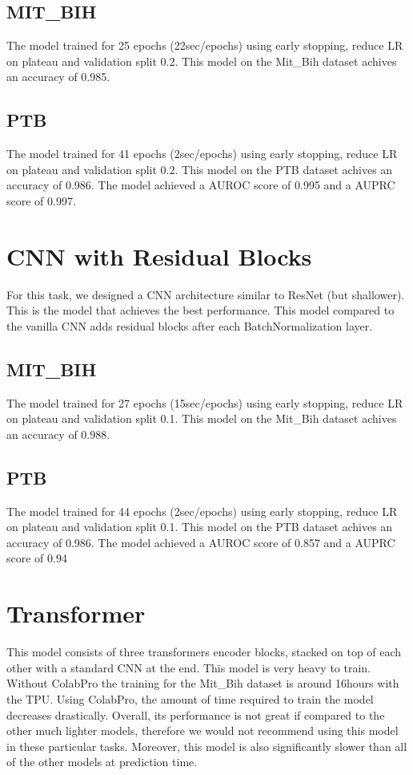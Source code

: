 \documentclass[11pt]{scrartcl}
\begin{document}
\subsection{MIT\_BIH}
The model trained for 25 epochs (22sec/epochs) using early stopping, reduce LR on plateau and validation split 0.2.
This model on the Mit\_Bih dataset achives an accuracy of 0.985.

\subsection{PTB}
The model trained for 41 epochs (2sec/epochs) using early stopping, reduce LR on plateau and validation split 0.2.
This model on the PTB dataset achives an accuracy of 0.986. The model achieved a AUROC score of 0.995 and a AUPRC score of 0.997.

\section{CNN with Residual Blocks}
For this task, we designed a CNN architecture similar to ResNet (but shallower). This is the model that achieves the best performance. This model compared to the vanilla CNN adds residual blocks after each BatchNormalization layer.
\subsection{MIT\_BIH}
The model trained for 27 epochs (15sec/epochs) using early stopping, reduce LR on plateau and validation split 0.1.
This model on the Mit\_Bih dataset achives an accuracy of 0.988.

\subsection{PTB}
The model trained for 44 epochs (2sec/epochs) using early stopping, reduce LR on plateau and validation split 0.1.
This model on the PTB dataset achives an accuracy of 0.986. The model achieved a AUROC score of 0.857 and a AUPRC score of 0.94

\section{Transformer}
This model consists of three transformers encoder blocks, stacked on top of each other with a standard CNN at the end. This model is very heavy to train. Without ColabPro the training for the Mit\_Bih dataset is around 16hours with the TPU.  Using ColabPro, the amount of time required to train the model decreases drastically. Overall, its performance is not great if compared to the other much lighter models, therefore we would not recommend using this model in these particular tasks. Moreover, this model is also significantly slower than all of the other models at prediction time.
\end{document}
